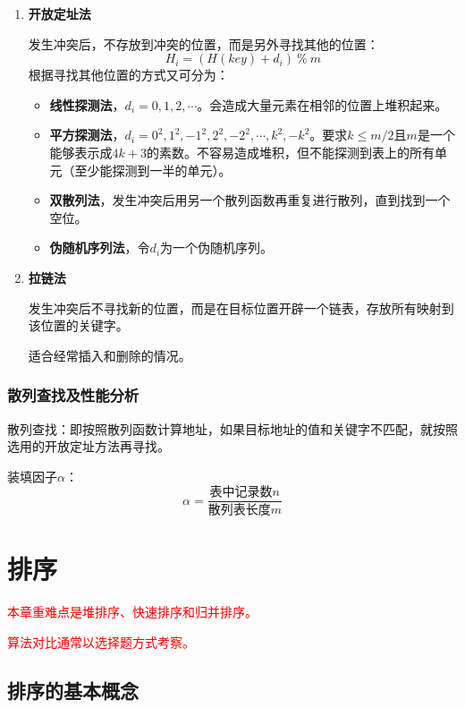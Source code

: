 \documentclass[12pt, a4paper, oneside]{ctexart}
\begin{document}
\begin{enumerate}
  \item {\bf 开放定址法}
  
  发生冲突后，不存放到冲突的位置，而是另外寻找其他的位置：
  \begin{equation*}
    H_i=(H(key)+d_i)\ \%\ m
  \end{equation*}
  根据寻找其他位置的方式又可分为：
  \begin{itemize}
    \item {\bf 线性探测法}，$d_i=0,1,2,\cdots$。会造成大量元素在相邻的位置上堆积起来。
    \item {\bf 平方探测法}，$d_i=0^2,1^2,{-1}^2,2^2,{-2}^2,\cdots,k^2,{-k}^2$。要求$k\leq m/2$且$m$是一个能够表示成$4k+3$的素数。不容易造成堆积，但不能探测到表上的所有单元（至少能探测到一半的单元）。
    \item {\bf 双散列法}，发生冲突后用另一个散列函数再重复进行散列，直到找到一个空位。
    \item {\bf 伪随机序列法}，令$d_i$为一个伪随机序列。
  \end{itemize}
  \item {\bf 拉链法}
  
  发生冲突后不寻找新的位置，而是在目标位置开辟一个链表，存放所有映射到该位置的关键字。

  适合经常插入和删除的情况。

\end{enumerate}

\subsubsection{散列查找及性能分析}

散列查找：即按照散列函数计算地址，如果目标地址的值和关键字不匹配，就按照选用的开放定址方法再寻找。

装填因子$\alpha$：
\begin{equation*}
  \alpha=\frac{\text{表中记录数}n}{\text{散列表长度}m}
\end{equation*}

\section{排序}

\textcolor{red}{本章重难点是堆排序、快速排序和归并排序。}

\textcolor{red}{算法对比通常以选择题方式考察。}

\subsection{排序的基本概念}
\end{document}
